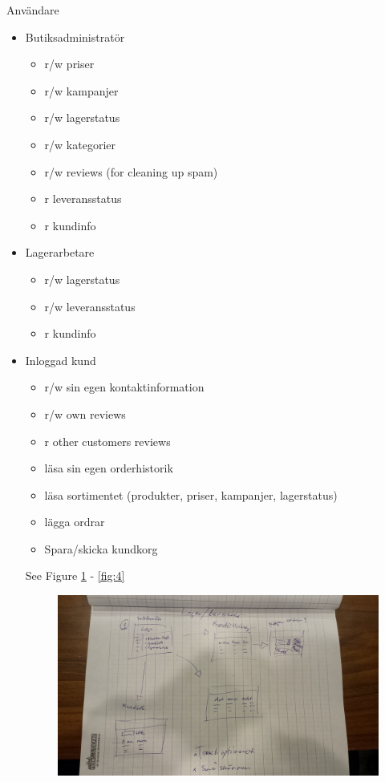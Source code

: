 \documentclass[paper=a4, fontsize=11pt]{report} %
\begin{document}
Användare
\begin{itemize}
	\item Butiksadministratör
		\begin{itemize}
			\item r/w priser
			\item r/w kampanjer
			\item r/w lagerstatus
			\item r/w kategorier
			\item r/w reviews (for cleaning up spam)
			\item r leveransstatus
			\item r kundinfo
		\end{itemize}
	\item Lagerarbetare
		\begin{itemize}
			\item r/w lagerstatus
			\item r/w leveransstatus
			\item r kundinfo
		\end{itemize}
	\item Inloggad kund
		\begin{itemize}
			\item r/w sin egen kontaktinformation
			\item r/w own reviews
			\item r other customers reviews
			\item läsa sin egen orderhistorik
			\item läsa sortimentet (produkter, priser, kampanjer, lagerstatus)
			\item lägga ordrar
			\item Spara/skicka kundkorg
		\end{itemize}

	See Figure \ref{fig:2} - \ref{fig:4}

	\begin{figure}
		\includegraphics[scale=0.12]{artifacts/Lager.jpeg}
		\caption{}
		\label{fig:2}
	\end{figure}


\end{itemize}
\end{document}
